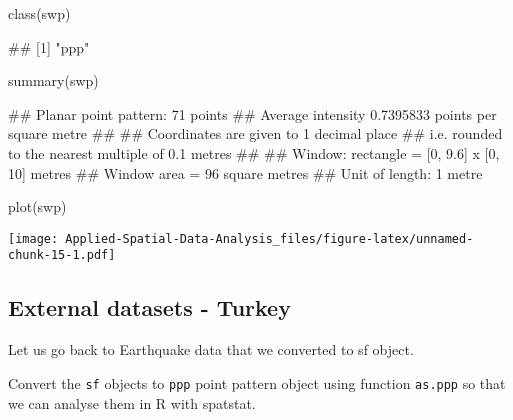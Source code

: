 \documentclass[
]{book}
\newenvironment{Shaded}{\begin{snugshade}}{\end{snugshade}}
\newcommand{\FunctionTok}[1]{\textcolor[rgb]{0.00,0.00,0.00}{#1}}
\newcommand{\NormalTok}[1]{#1}
\begin{document}
\begin{Shaded}
\begin{Highlighting}[]
\FunctionTok{class}\NormalTok{(swp)}
\end{Highlighting}
\end{Shaded}

\begin{Shaded}
\begin{Highlighting}[]
\NormalTok{\#\# [1] "ppp"}
\end{Highlighting}
\end{Shaded}

\begin{Shaded}
\begin{Highlighting}[]
\FunctionTok{summary}\NormalTok{(swp)}
\end{Highlighting}
\end{Shaded}

\begin{Shaded}
\begin{Highlighting}[]
\NormalTok{\#\# Planar point pattern:  71 points}
\NormalTok{\#\# Average intensity 0.7395833 points per square metre}
\NormalTok{\#\# }
\NormalTok{\#\# Coordinates are given to 1 decimal place}
\NormalTok{\#\# i.e. rounded to the nearest multiple of 0.1 metres}
\NormalTok{\#\# }
\NormalTok{\#\# Window: rectangle = [0, 9.6] x [0, 10] metres}
\NormalTok{\#\# Window area = 96 square metres}
\NormalTok{\#\# Unit of length: 1 metre}
\end{Highlighting}
\end{Shaded}

\begin{Shaded}
\begin{Highlighting}[]
\FunctionTok{plot}\NormalTok{(swp)}
\end{Highlighting}
\end{Shaded}

\texttt{[image: Applied-Spatial-Data-Analysis\_files/figure-latex/unnamed-chunk-15-1.pdf]}

\hypertarget{external-datasets---turkey}{%
\subsection{External datasets - Turkey}\label{external-datasets---turkey}}

Let us go back to Earthquake data that we converted to sf object.

Convert the \texttt{sf} objects to \texttt{ppp} point pattern object using function \texttt{as.ppp} so that we can analyse them in R with spatstat.
\end{document}
